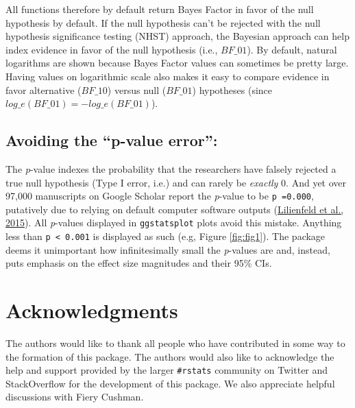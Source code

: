 \documentclass[
]{article}
\begin{document}
All functions therefore by default return Bayes Factor
in favor of the null hypothesis by default. If the null hypothesis can't be
rejected with the null hypothesis significance testing (NHST) approach, the
Bayesian approach can help index evidence in favor of the null hypothesis (i.e.,
\(BF\_{01}\)). By default, natural logarithms are shown because Bayes Factor
values can sometimes be pretty large. Having values on logarithmic scale also
makes it easy to compare evidence in favor alternative (\(BF\_{10}\)) versus null
(\(BF\_{01}\)) hypotheses (since \(log\_{e}(BF\_{01}) = - log\_{e}(BF\_{01})\)).

\hypertarget{avoiding-the-p-value-error}{%
\subsection{\texorpdfstring{Avoiding the \textbf{``p-value error''}:}{Avoiding the ``p-value error'':}}\label{avoiding-the-p-value-error}}

The \emph{p}-value indexes the probability that the researchers have falsely rejected
a true null hypothesis (Type I error, i.e.) and can rarely be \emph{exactly} 0. And
yet over 97,000 manuscripts on Google Scholar report the \emph{p}-value to be \texttt{p\ =0.000},
putatively due to relying on default computer software outputs
(\protect\hyperlink{ref-lilienfeldFiftyPsychologicalPsychiatric2015}{Lilienfeld et al., 2015}). All \emph{p}-values displayed in
\texttt{ggstatsplot} plots avoid this mistake. Anything less than \texttt{p\ \textless{}\ 0.001} is
displayed as such (e.g, Figure \ref{fig:fig1}). The package deems it unimportant how
infinitesimally small the \emph{p}-values are and, instead, puts emphasis on the
effect size magnitudes and their 95\% CIs.

\newpage

\hypertarget{acknowledgments}{%
\section{Acknowledgments}\label{acknowledgments}}

The authors would like to thank all people who have contributed in some way to
the formation of this package. The authors would also like to acknowledge the
help and support provided by the larger \texttt{\#rstats} community on Twitter and
StackOverflow for the development of this package. We also appreciate helpful
discussions with Fiery Cushman.

\newpage
\end{document}
